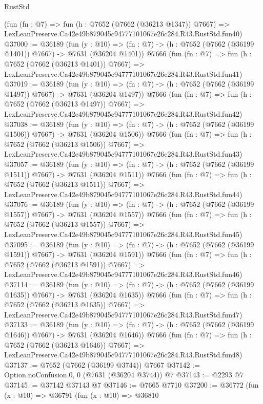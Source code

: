\begin{lexlean}{RustStd}
\begin{coremodule}
    (fun (fn : @7) =>
    fun (h : @7652 (@7662 (@36213 @1347)) @7667) =>
    LexLeanPreserve.Ca42e49b879045c94777101067e26c284.R43.RustStd.fun40)
@37000 := @36189
    (fun (y : @10) => (fn : @7) -> (h : @7652 (@7662 (@36199 @1401)) @7667) -> @7631 (@36204 @1401))
    @7666
    (fun (fn : @7) =>
    fun (h : @7652 (@7662 (@36213 @1401)) @7667) =>
    LexLeanPreserve.Ca42e49b879045c94777101067e26c284.R43.RustStd.fun41)
@37019 := @36189
    (fun (y : @10) => (fn : @7) -> (h : @7652 (@7662 (@36199 @1497)) @7667) -> @7631 (@36204 @1497))
    @7666
    (fun (fn : @7) =>
    fun (h : @7652 (@7662 (@36213 @1497)) @7667) =>
    LexLeanPreserve.Ca42e49b879045c94777101067e26c284.R43.RustStd.fun42)
@37038 := @36189
    (fun (y : @10) => (fn : @7) -> (h : @7652 (@7662 (@36199 @1506)) @7667) -> @7631 (@36204 @1506))
    @7666
    (fun (fn : @7) =>
    fun (h : @7652 (@7662 (@36213 @1506)) @7667) =>
    LexLeanPreserve.Ca42e49b879045c94777101067e26c284.R43.RustStd.fun43)
@37057 := @36189
    (fun (y : @10) => (fn : @7) -> (h : @7652 (@7662 (@36199 @1511)) @7667) -> @7631 (@36204 @1511))
    @7666
    (fun (fn : @7) =>
    fun (h : @7652 (@7662 (@36213 @1511)) @7667) =>
    LexLeanPreserve.Ca42e49b879045c94777101067e26c284.R43.RustStd.fun44)
@37076 := @36189
    (fun (y : @10) => (fn : @7) -> (h : @7652 (@7662 (@36199 @1557)) @7667) -> @7631 (@36204 @1557))
    @7666
    (fun (fn : @7) =>
    fun (h : @7652 (@7662 (@36213 @1557)) @7667) =>
    LexLeanPreserve.Ca42e49b879045c94777101067e26c284.R43.RustStd.fun45)
@37095 := @36189
    (fun (y : @10) => (fn : @7) -> (h : @7652 (@7662 (@36199 @1591)) @7667) -> @7631 (@36204 @1591))
    @7666
    (fun (fn : @7) =>
    fun (h : @7652 (@7662 (@36213 @1591)) @7667) =>
    LexLeanPreserve.Ca42e49b879045c94777101067e26c284.R43.RustStd.fun46)
@37114 := @36189
    (fun (y : @10) => (fn : @7) -> (h : @7652 (@7662 (@36199 @1635)) @7667) -> @7631 (@36204 @1635))
    @7666
    (fun (fn : @7) =>
    fun (h : @7652 (@7662 (@36213 @1635)) @7667) =>
    LexLeanPreserve.Ca42e49b879045c94777101067e26c284.R43.RustStd.fun47)
@37133 := @36189
    (fun (y : @10) => (fn : @7) -> (h : @7652 (@7662 (@36199 @1646)) @7667) -> @7631 (@36204 @1646))
    @7666
    (fun (fn : @7) =>
    fun (h : @7652 (@7662 (@36213 @1646)) @7667) =>
    LexLeanPreserve.Ca42e49b879045c94777101067e26c284.R43.RustStd.fun48)
@37137 := @7652 (@7662 (@36199 @3744)) @7667
@37142 := Option.noConfusion.{0, 0} (@7631 (@36204 @3744)) @7
@37143 := @2293 @7
@37145 := @37142 @37143 @7
@37146 := @7665 @7710
@37200 := @36772
    (fun (x : @10) =>
    @36791
      (fun (x : @10) =>
      @36810

\end{coremodule}
\end{lexlean}
